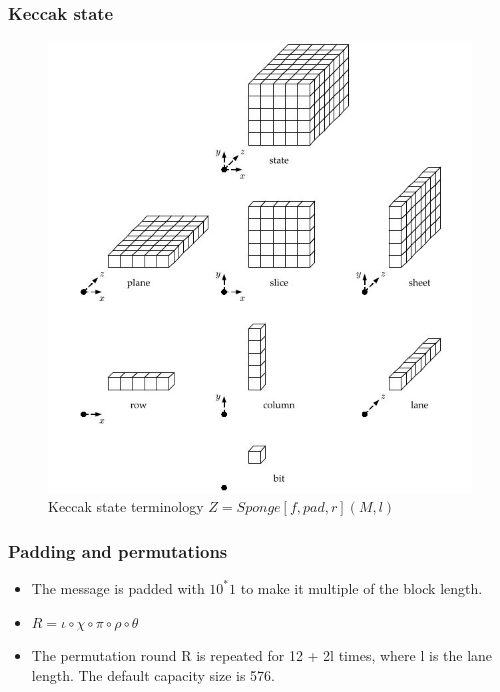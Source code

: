 \documentclass{beamer}
\begin{document}
\begin{frame}
\frametitle{Keccak state}
\begin{figure}[h]
  \begin{center}
    \includegraphics[scale=0.25]{keccakstateterminology.jpg}
  \end{center}
  \caption{Keccak state terminology $Z = Sponge[f, pad, r](M, l)$\footnotemark}
  \label{fig:lab}
\end{figure}
\end{frame}

\begin{frame}
\frametitle{Padding and permutations}
\begin{itemize}
\item The message is padded with $1 0^{*}1$ to make it multiple of the block length.
\item $R = \iota \circ \chi \circ \pi \circ \rho \circ \theta$
\item The permutation round R is repeated for 12 + 2l times, where l is the lane length. The default
capacity size is 576.
\end{itemize}
\end{frame}
\end{document}

